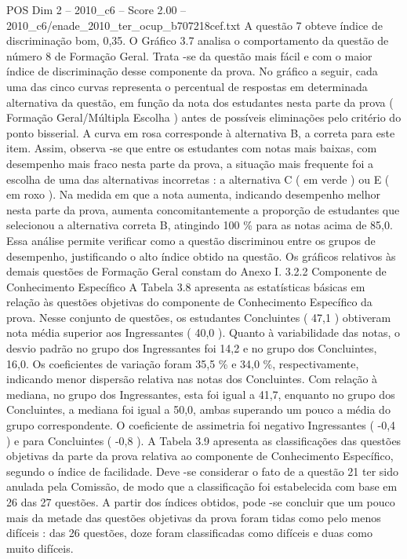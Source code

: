 \begin{textsample}{POS Dim 2 – 2010\_c6 – Score 2.00 – 2010\_c6/enade\_2010\_ter\_ocup\_b707218cef.txt}
A questão 7 obteve índice de discriminação bom, 0,35.
O Gráfico 3.7 analisa o comportamento da questão de número 8 de Formação Geral.
Trata -se da questão mais fácil e com o maior índice de discriminação desse componente da prova.
No gráfico a seguir, cada uma das cinco curvas representa o percentual de respostas em determinada alternativa da questão, em função da nota dos estudantes nesta parte da prova ( Formação Geral/Múltipla Escolha ) antes de possíveis eliminações pelo critério do ponto bisserial.
A curva em rosa corresponde à alternativa B, a correta para este item.
Assim, observa -se que entre os estudantes com notas mais baixas, com desempenho mais fraco nesta parte da prova, a situação mais frequente foi a escolha de uma das alternativas incorretas : a alternativa C ( em verde ) ou E ( em roxo ).
Na medida em que a nota aumenta, indicando desempenho melhor nesta parte da prova, aumenta concomitantemente a proporção de estudantes que selecionou a alternativa correta B, atingindo 100 \% para as notas acima de 85,0.
Essa análise permite verificar como a questão discriminou entre os grupos de desempenho, justificando o alto índice obtido na questão.
Os gráficos relativos às demais questões de Formação Geral constam do Anexo I. 3.2.2 Componente de Conhecimento Específico A Tabela 3.8 apresenta as estatísticas básicas em relação às questões objetivas do componente de Conhecimento Específico da prova.
Nesse conjunto de questões, os estudantes Concluintes ( 47,1 ) obtiveram nota média superior aos Ingressantes ( 40,0 ).
Quanto à variabilidade das notas, o desvio padrão no grupo dos Ingressantes foi 14,2 e no grupo dos Concluintes, 16,0.
Os coeficientes de variação foram 35,5 \% e 34,0 \%, respectivamente, indicando menor dispersão relativa nas notas dos Concluintes.
Com relação à mediana, no grupo dos Ingressantes, esta foi igual a 41,7, enquanto no grupo dos Concluintes, a mediana foi igual a 50,0, ambas superando um pouco a média do grupo correspondente.
O coeficiente de assimetria foi negativo Ingressantes ( -0,4 ) e para Concluintes ( -0,8 ).
A Tabela 3.9 apresenta as classificações das questões objetivas da parte da prova relativa ao componente de Conhecimento Específico, segundo o índice de facilidade.
Deve -se considerar o fato de a questão 21 ter sido anulada pela Comissão, de modo que a classificação foi estabelecida com base em 26 das 27 questões.
A partir dos índices obtidos, pode -se concluir que um pouco mais da metade das questões objetivas da prova foram tidas como pelo menos difíceis : das 26 questões, doze foram classificadas como difíceis e duas como muito difíceis.

\end{textsample}

